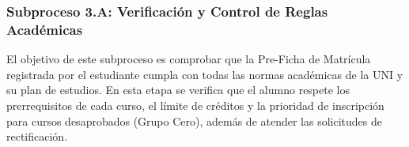 \subsubsection{Subproceso 3.A: Verificación y Control de Reglas Académicas}

El objetivo de este subproceso es comprobar que la Pre-Ficha de Matrícula registrada por el estudiante cumpla con todas las normas académicas de la UNI y su plan de estudios. En esta etapa se verifica que el alumno respete los prerrequisitos de cada curso, el límite de créditos y la prioridad de inscripción para cursos desaprobados (Grupo Cero), además de atender las solicitudes de rectificación.
